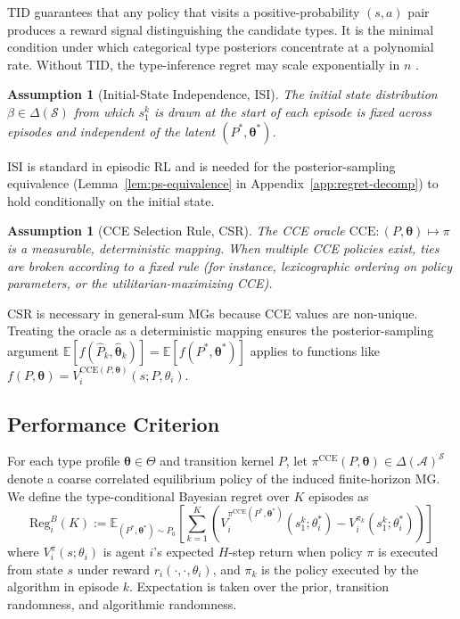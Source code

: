 \documentclass{article}
\newtheorem{assumption}[theorem]{Assumption}
\begin{document}
TID guarantees that any policy that visits a positive-probability $(s, a)$ pair produces a reward signal distinguishing the candidate types. It is the minimal condition under which categorical type posteriors concentrate at a polynomial rate. Without TID, the type-inference regret may scale exponentially in $n$ \citep{kwon2021rl}.

\begin{assumption}[Initial-State Independence, ISI]
\label{ass:ISI}
The initial state distribution $\beta \in \Delta(\mathcal{S})$ from which $s_1^k$ is drawn at the start of each episode is fixed across episodes and independent of the latent $(P^*, \boldsymbol{\theta}^*)$.
\end{assumption}

ISI is standard in episodic RL and is needed for the posterior-sampling equivalence (Lemma~\ref{lem:ps-equivalence} in Appendix~\ref{app:regret-decomp}) to hold conditionally on the initial state.

\begin{assumption}[CCE Selection Rule, CSR]
\label{ass:CSR}
The CCE oracle $\mathrm{CCE}: (P, \boldsymbol{\theta}) \mapsto \pi$ is a measurable, deterministic mapping. When multiple CCE policies exist, ties are broken according to a fixed rule (for instance, lexicographic ordering on policy parameters, or the utilitarian-maximizing CCE).
\end{assumption}

CSR is necessary in general-sum MGs because CCE values are non-unique. Treating the oracle as a deterministic mapping ensures the posterior-sampling argument $\mathbb{E}[f(\hat{P}_k, \hat{\boldsymbol{\theta}}_k)] = \mathbb{E}[f(P^*, \boldsymbol{\theta}^*)]$ applies to functions like $f(P, \boldsymbol{\theta}) = V_i^{\mathrm{CCE}(P, \boldsymbol{\theta})}(s; P, \theta_i)$.

\subsection{Performance Criterion}

For each type profile $\boldsymbol{\theta} \in \Theta$ and transition kernel $P$, let $\pi^{\mathrm{CCE}}(P, \boldsymbol{\theta}) \in \Delta(\mathcal{A})^{\mathcal{S}}$ denote a coarse correlated equilibrium policy of the induced finite-horizon MG. We define the type-conditional Bayesian regret over $K$ episodes as
\begin{equation}
\label{eq:regret-def}
\mathrm{Reg}_i^B(K) := \mathbb{E}_{(P^*, \boldsymbol{\theta}^*) \sim P_0} \left[ \sum_{k=1}^K \left( V_i^{\pi^{\mathrm{CCE}}(P^*, \boldsymbol{\theta}^*)}(s_1^k; \theta_i^*) - V_i^{\pi_k}(s_1^k; \theta_i^*) \right) \right]
\end{equation}
where $V_i^\pi(s; \theta_i)$ is agent $i$'s expected $H$-step return when policy $\pi$ is executed from state $s$ under reward $r_i(\cdot, \cdot, \theta_i)$, and $\pi_k$ is the policy executed by the algorithm in episode $k$. Expectation is taken over the prior, transition randomness, and algorithmic randomness.
\end{document}
